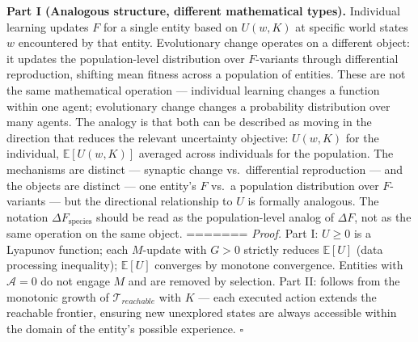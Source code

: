 \documentclass[
]{article}
\begin{document}
\textbf{Part I (Analogous structure, different mathematical types).}
Individual learning updates \(F\) for a single entity based on
\(U(w, K)\) at specific world states \(w\) encountered by that entity.
Evolutionary change operates on a different object: it updates the
population-level distribution over \(F\)-variants through differential
reproduction, shifting mean fitness across a population of entities.
These are not the same mathematical operation --- individual learning
changes a function within one agent; evolutionary change changes a
probability distribution over many agents. The analogy is that both can
be described as moving in the direction that reduces the relevant
uncertainty objective: \(U(w, K)\) for the individual,
\(\mathbb{E}[U(w, K)]\) averaged across individuals for the population.
The mechanisms are distinct --- synaptic change vs.~differential
reproduction --- and the objects are distinct --- one entity's \(F\)
vs.~a population distribution over \(F\)-variants --- but the
directional relationship to \(U\) is formally analogous. The notation
\(\Delta F_{\text{species}}\) should be read as the population-level
analog of \(\Delta F\), not as the same operation on the same object.
=======
\emph{Proof.} Part I: \(U \geq 0\) is a Lyapunov function; each
\(M\)-update with \(G > 0\) strictly reduces \(\mathbb{E}[U]\) (data
processing inequality); \(\mathbb{E}[U]\) converges by monotone
convergence. Entities with \(\mathcal{A} = 0\) do not engage \(M\) and
are removed by selection. Part II: follows from the monotonic growth of
\(\mathcal{T}_{reachable}\) with \(K\) --- each executed action extends
the reachable frontier, ensuring new unexplored states are always
accessible within the domain of the entity's possible experience.
\(\square\)
\end{document}
